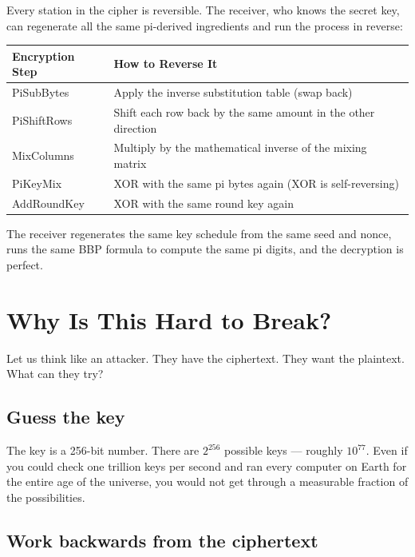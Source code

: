\documentclass[12pt, a4paper]{article}
\begin{document}
Every station in the cipher is reversible. The receiver, who knows the secret key, can regenerate all the same pi-derived ingredients and run the process in reverse:

\begin{center}
\renewcommand{\arraystretch}{1.4}
\begin{tabular}{ll}
\toprule
\textbf{Encryption Step} & \textbf{How to Reverse It} \\
\midrule
PiSubBytes & Apply the inverse substitution table (swap back) \\
PiShiftRows & Shift each row back by the same amount in the other direction \\
MixColumns & Multiply by the mathematical inverse of the mixing matrix \\
PiKeyMix & XOR with the same pi bytes again (XOR is self-reversing) \\
AddRoundKey & XOR with the same round key again \\
\bottomrule
\end{tabular}
\end{center}

\vspace{0.5em}
The receiver regenerates the same key schedule from the same seed and nonce, runs the same BBP formula to compute the same pi digits, and the decryption is perfect.

\section{Why Is This Hard to Break?}

\vspace{0.5em}

Let us think like an attacker. They have the ciphertext. They want the plaintext. What can they try?

\subsection{Guess the key}

The key is a 256-bit number. There are $2^{256}$ possible keys --- roughly $10^{77}$. Even if you could check one trillion keys per second and ran every computer on Earth for the entire age of the universe, you would not get through a measurable fraction of the possibilities.

\subsection{Work backwards from the ciphertext}
\end{document}
